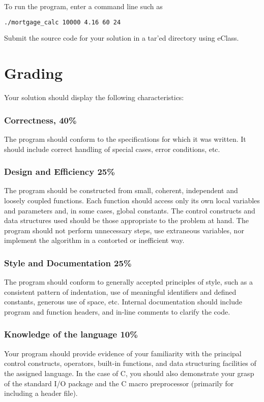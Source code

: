 \documentclass[12pt,info]{asg}
\begin{document}
To run the program, enter a command line such as
\begin{lstlisting}[language=bash]
./mortgage_calc 10000 4.16 60 24
\end{lstlisting}

Submit the source code for your solution in a tar'ed directory using eClass.

\section*{Grading}
Your solution should display the following characteristics:
\subsubsection*{Correctness, 40\%}
The program should conform to the specifications for which it was written. It should include correct handling of special cases, error conditions, etc.
\subsubsection*{Design and Efficiency 25\%} The program should be constructed from small, coherent, independent and loosely coupled functions. Each function should access only its own local variables and parameters and, in some cases, global constants. The control constructs and data structures used should be those appropriate to the problem at hand. The program should not perform unnecessary steps, use extraneous variables, nor implement the algorithm in a contorted or inefficient way.
\subsubsection*{Style and Documentation 25\%} The program should conform to generally accepted principles of style, such as a consistent pattern of indentation, use of meaningful identifiers and defined constants, generous use of space, etc. Internal documentation should include program and function headers, and in-line comments to clarify the code.
\subsubsection*{Knowledge of the language 10\%} Your program should provide evidence of your familiarity with the principal control constructs, operators, built-in functions, and data structuring facilities of the assigned language. In the case of C, you should also demonstrate your grasp of the standard I/O package and the C macro preprocessor (primarily for including a header file).
\end{document}
